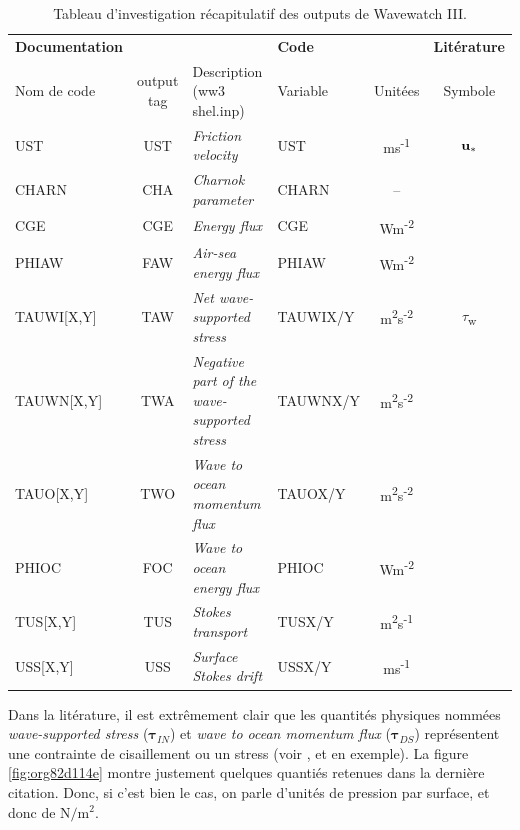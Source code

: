 \documentclass[10pt]{report}
\numberwithin{equation}{section}
\newcommand{\ust}{\vb{u}_{\ast}}
\begin{document}
\begin{table}[htbp]
\caption{\label{tab:orgc6814e1}Tableau d'investigation récapitulatif des outputs de Wavewatch III.}
\centering
\begin{tabular}{lcl|lc|c}
\hline
\hline
\textbf{Documentation} &  &  & \textbf{Code} &  & \textbf{Litérature}\\[0pt]
Nom de code & output tag & Description (ww3 shel.inp) & Variable & Unitées & Symbole\\[0pt]
\hline
UST & UST & \emph{Friction velocity} & UST & ms\textsuperscript{-1} & \(\ust\)\\[0pt]
CHARN & CHA & \emph{Charnok parameter} & CHARN & -- & \\[0pt]
CGE & CGE & \emph{Energy flux} & CGE & Wm\textsuperscript{-2} & \\[0pt]
PHIAW & FAW & \emph{Air-sea energy flux} & PHIAW & Wm\textsuperscript{-2} & \\[0pt]
TAUWI[X,Y] & TAW & \emph{Net wave-supported stress} & TAUWIX/Y & m\textsuperscript{2}s\textsuperscript{-2} & \(\tau\)\textsubscript{w}\\[0pt]
TAUWN[X,Y] & TWA & \emph{Negative part of the wave-supported stress} & TAUWNX/Y & m\textsuperscript{2}s\textsuperscript{-2} & \\[0pt]
\hline
TAUO[X,Y] & TWO & \emph{Wave to ocean momentum flux} & TAUOX/Y & m\textsuperscript{2}s\textsuperscript{-2} & \\[0pt]
PHIOC & FOC & \emph{Wave to ocean energy flux} & PHIOC & Wm\textsuperscript{-2} & \\[0pt]
TUS[X,Y] & TUS & \emph{Stokes transport} & TUSX/Y & m\textsuperscript{2}s\textsuperscript{-1} & \\[0pt]
USS[X,Y] & USS & \emph{Surface Stokes drift} & USSX/Y & ms\textsuperscript{-1} & \\[0pt]
\hline
\end{tabular}
\end{table}

Dans la litérature, il est extrêmement clair que les quantités physiques nommées \emph{wave-supported stress} (\(\boldsymbol{\tau}_{IN}\)) et \emph{wave to ocean momentum flux} (\(\boldsymbol{\tau}_{DS}\)) représentent une contrainte de cisaillement ou un stress (voir \Textcite{breivik_al_2015}, \Textcite{ardhuin2010semiempirical} et \Textcite{couvelard2020development} en exemple).
La figure \ref{fig:org82d114e} montre justement quelques quantiés retenues dans la dernière citation.
Donc, si c'est bien le cas, on parle d'unités de pression par surface, et donc de \(\mathrm{N}/\mathrm{m}^2\).\bigskip
\end{document}
